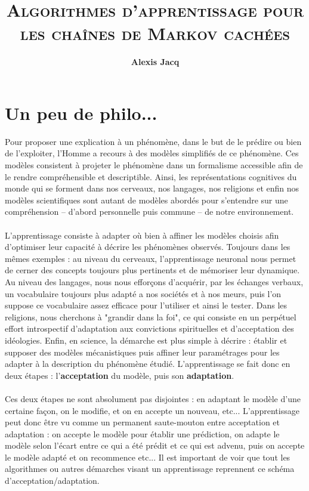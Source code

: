 \documentclass{article}
\title{\textbf{\textsc{Algorithmes d'apprentissage pour les chaînes de Markov
cachées}}\vspace{4mm}}
\author{\textbf{Alexis Jacq}\vspace{4mm}}
\begin{document}
\maketitle

\section{Un peu de philo...}
Pour proposer une explication à un phénomène, dans le but de le prédire ou bien de l'exploiter, l'Homme a recours à des modèles simplifiés de ce phénomène. Ces modèles consistent à projeter le phénomène dans un formalisme accessible afin de le rendre compréhensible et descriptible.  Ainsi, les représentations cognitives du monde qui se forment dans nos cerveaux, nos langages, nos religions et enfin nos modèles scientifiques sont autant de modèles abordés pour s'entendre sur une compréhension -- d'abord personnelle puis commune -- de notre environnement. \\
\\
L'apprentissage consiste à adapter où bien à affiner les modèles choisis afin d'optimiser leur capacité à décrire les phénomènes observés. Toujours dans les mêmes exemples : au niveau du cerveaux, l'apprentissage neuronal nous permet de cerner des concepts toujours plus pertinents et de mémoriser leur dynamique. Au niveau des langages, nous nous efforçons d’acquérir, par les échanges verbaux, un vocabulaire toujours plus adapté a nos sociétés et à nos meurs, puis l'on suppose ce vocabulaire assez efficace pour l'utiliser et ainsi le tester. Dans les religions, nous cherchons à "grandir dans la foi", ce qui consiste en un perpétuel effort introspectif d'adaptation aux convictions spirituelles et d'acceptation des idéologies. Enfin, en science, la démarche est plus simple à décrire : établir et supposer des modèles mécanistiques puis affiner leur paramétrages pour les adapter à la description du phénomène étudié. L'apprentissage se fait donc en deux étapes : l'\textbf{acceptation} du modèle, puis son \textbf{adaptation}. \\
\\
Ces deux étapes ne sont absolument pas disjointes : en adaptant le modèle d'une certaine façon, on le modifie, et on en accepte un nouveau, etc... L'apprentissage peut donc \^etre vu comme un permanent saute-mouton entre acceptation et adaptation : on accepte le modèle pour établir une prédiction, on adapte le modèle selon l'écart entre ce qui a été prédit et ce qui est advenu, puis on accepte le modèle adapté et on recommence etc... Il est important de voir que tout les algorithmes ou autres démarches visant un apprentissage reprennent ce schéma d'acceptation/adaptation. 
\end{document}
